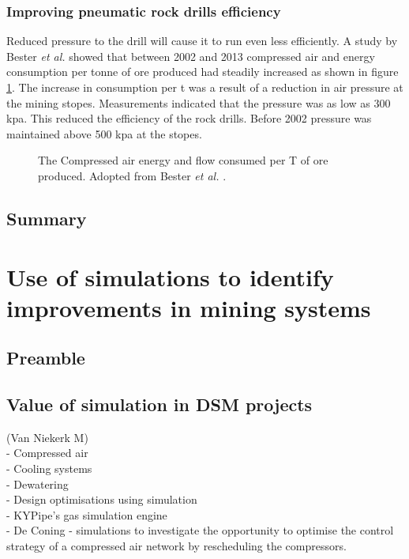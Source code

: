 		\subsubsection{Improving pneumatic rock drills efficiency}
		Reduced pressure to the drill will cause it to run even less efficiently. A study by  Bester \textit{et al.} showed that between 2002 and 2013 compressed air and energy consumption per tonne of ore produced had steadily increased as shown in figure \ref{fig: Compressed energy and air flow per ton}. The increase in consumption per \gls{t} was a result of a reduction in air pressure at the mining stopes. Measurements indicated that the pressure was as low as 300 \gls{kpa}. This reduced the efficiency of the rock drills. Before 2002 pressure was maintained above 500 \gls{kpa} at the stopes.\cite{bester2013effect} \par
		\begin{figure}[h]
			\centering
			\fbox{}
			\caption[The Compressed air energy and flow consumed per T of ore produced.]{The Compressed air energy and flow consumed per T of ore produced. Adopted from Bester \textit{et al.} \cite{bester2013effect}.}
			\label{fig: Compressed energy and air flow per ton}
		\end{figure}
	\subsection{Summary}
\section{Use of simulations to identify improvements in mining systems}
	\subsection{Preamble}
	\subsection{Value of simulation in DSM projects}
		(Van Niekerk M)\\
		- Compressed air \\
		- Cooling systems\\
		- Dewatering\\
		- Design optimisations using simulation\\
 		- KYPipe’s gas simulation engine\\
		- De Coning -  simulations to investigate the opportunity to optimise the control strategy of a compressed air network by rescheduling the compressors.
